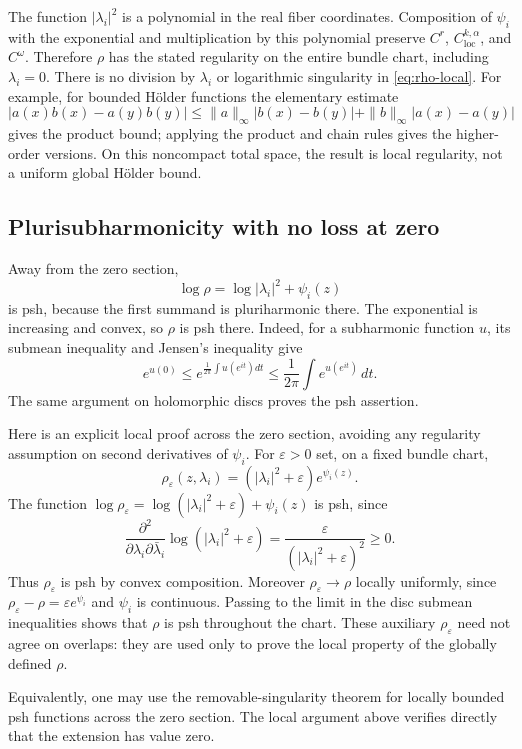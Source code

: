 \documentclass[11pt]{amsart}
\theoremstyle{definition}
\theoremstyle{remark}
\numberwithin{equation}{section}
\newcommand{\loc}{\mathrm{loc}}
\begin{document}
The function $|\lambda_i|^2$ is a polynomial in the real fiber
coordinates. Composition of $\psi_i$ with the exponential and
multiplication by this polynomial preserve $C^r$, $C^{k,\alpha}_{\loc}$,
and $C^\omega$. Therefore $\rho$ has the stated regularity on the
entire bundle chart, including $\lambda_i=0$. There is no division
by $\lambda_i$ or logarithmic singularity in \eqref{eq:rho-local}.
For example, for bounded H\"older functions the elementary estimate
\[
|a(x)b(x)-a(y)b(y)|
\le\|a\|_\infty|b(x)-b(y)|+\|b\|_\infty|a(x)-a(y)|
\]
gives the product bound; applying the product and chain rules gives
the higher-order versions. On this noncompact total space, the
result is local regularity, not a uniform global H\"older bound.

\subsection{Plurisubharmonicity with no loss at zero}

Away from the zero section,
\[
\log\rho=\log|\lambda_i|^2+\psi_i(z)
\]
is psh, because the first summand is pluriharmonic there. The
exponential is increasing and convex, so $\rho$ is psh there.
Indeed, for a subharmonic function $u$, its submean inequality and
Jensen's inequality give
\[
e^{u(0)}\le e^{\frac1{2\pi}\int u(e^{it})dt}
\le\frac1{2\pi}\int e^{u(e^{it})}\,dt.
\]
The same argument on holomorphic discs proves the psh assertion.

Here is an explicit local proof across the zero section, avoiding
any regularity assumption on second derivatives of $\psi_i$.
For $\varepsilon>0$ set, on a fixed bundle chart,
\[
\rho_\varepsilon(z,\lambda_i)
=(|\lambda_i|^2+\varepsilon)e^{\psi_i(z)}.
\]
The function
$\log\rho_\varepsilon=\log(|\lambda_i|^2+\varepsilon)+\psi_i(z)$
is psh, since
\[
\frac{\partial^2}{\partial\lambda_i\partial\bar\lambda_i}
\log(|\lambda_i|^2+\varepsilon)
=\frac{\varepsilon}{(|\lambda_i|^2+\varepsilon)^2}\ge0.
\]
Thus $\rho_\varepsilon$ is psh by convex composition.
Moreover $\rho_\varepsilon\to\rho$ locally uniformly, since
$\rho_\varepsilon-\rho=\varepsilon e^{\psi_i}$ and $\psi_i$ is
continuous. Passing to the limit in the disc submean inequalities
shows that $\rho$ is psh throughout the chart. These auxiliary
$\rho_\varepsilon$ need not agree on overlaps: they are used only
to prove the local property of the globally defined $\rho$.

Equivalently, one may use the removable-singularity theorem for
locally bounded psh functions across the zero section. The local
argument above verifies directly that the extension has value zero.
\end{document}
